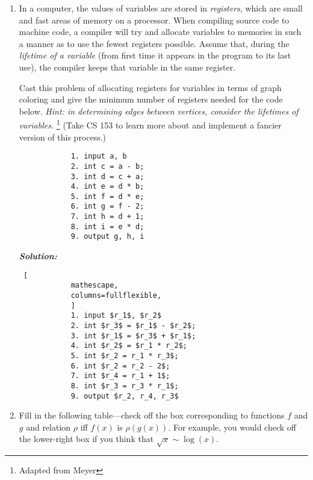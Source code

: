 \documentclass[12pt]{article}
\begin{document}
\begin{enumerate}
    \item In a computer, the values of variables are stored in \textit{registers}, which are small and fast areas of memory on a processor. When compiling source code to machine code, a compiler will try and allocate variables to memories in such a manner as to use the fewest registers possible. Assume that, during the \textit{lifetime of a variable} (from first time it appears in the program to its last use), the compiler keeps that variable in the same register. 

        Cast this problem of allocating registers for variables in terms of graph coloring and give the minimum number of registers needed for the code below. \textit{Hint: in determining edges between vertices, consider the lifetimes of variables.} \footnote{Adapted from Meyer}
        (Take CS 153 to learn more about and implement a fancier version of this process.)

        \begin{verbatim}
            1. input a, b
            2. int c = a - b;
            3. int d = c + a;
            4. int e = d * b;
            5. int f = d * e;
            6. int g = f - 2;
            7. int h = d + 1;
            8. int i = e * d; 
            9. output g, h, i
        \end{verbatim}

        \textbf{\it{Solution: }} \\

        \begin{lstlisting} [
            mathescape,
            columns=fullflexible,
            ]
            1. input $r_1$, $r_2$ 
            2. int $r_3$ = $r_1$ - $r_2$;
            3. int $r_1$ = $r_3$ + $r_1$;
            4. int $r_2$ = $r_1 * r_2$;
            5. int $r_2 = r_1 * r_3$;
            6. int $r_2 = r_2 - 2$;
            7. int $r_4 = r_1 + 1$;
            8. int $r_3 = r_3 * r_1$; 
            9. output $r_2, r_4, r_3$
        \end{lstlisting}


    \item Fill in the following table---check off the box corresponding to functions $f$ and $g$ and relation $\rho$ iff $f(x)$ is $\rho(g(x))$. For example, you would check off the lower-right box if you think that $\sqrt x\sim\log(x)$.


\end{enumerate}
\end{document}
